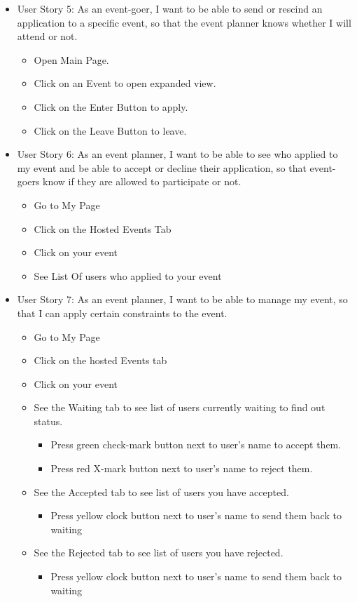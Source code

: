 \documentclass[10pt]{article}
\begin{document}
\begin{itemize}
	    	\item User Story 5: As an event-goer, I want to be able to send or rescind an application to a specific event, so that the event planner knows whether I will attend or not.
	    	\begin{itemize}
	    		\item Open Main Page.
	    		\item Click on an Event to open expanded view.
	    		\item Click on the Enter Button to apply.
	    		\item Click on the Leave Button to leave.
	    	\end{itemize}
	
	    	\item User Story 6: As an event planner, I want to be able to see who applied to my event and be able to accept or decline their application, so that event-goers know if they are allowed to participate or not.
	    	\begin{itemize}
	    		\item Go to My Page
	    		\item Click on the Hosted Events Tab
	    		\item Click on your event
	    		\item See List Of users who applied to your event
	    	\end{itemize}
	    
	    	\item User Story 7: As an event planner, I want to be able to manage my event, so that I can apply certain constraints to the event.
	    	\begin{itemize}
	    		\item Go to My Page
	    		\item Click on the hosted Events tab
	    		\item Click on your event
	    		\item See the Waiting tab to see list of users currently waiting to find out status.
	    		\begin{itemize}
	    			\item Press green check-mark button next to user's name to accept them.
	    			\item Press red X-mark button next to user's name to reject them.
		    	\end{itemize}
		    	\item See the Accepted tab to see list of users you have accepted.
		    	\begin{itemize}
		    		\item Press yellow clock button next to user's name to send them back to waiting
		    	\end{itemize}
		    	\item See the Rejected tab to see list of users you have rejected.
		    	\begin{itemize}
		    		\item Press yellow clock button next to user's name to send them back to waiting
		    	\end{itemize}
	    	\end{itemize}
	    	
	    \end{itemize}
\end{document}
